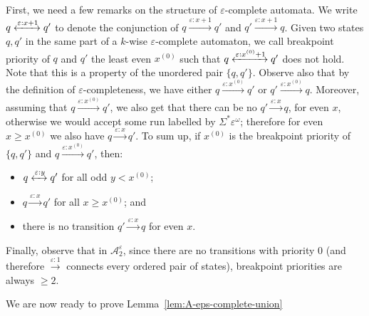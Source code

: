 \documentclass[a4paper,UKenglish,cleveref, thm-restate]{lipics-v2021}
\newcommand{\re}[1]{\xrightarrow{#1}}
\newcommand{\rer}[1]{\xleftrightarrow{#1}}
\newcommand{\eps}{\varepsilon}
\newcommand{\A}{\mathcal{A}}
\newcommand{\xbreak}{x^{(0)}}
\begin{document}
First, we need a few remarks on the structure of $\eps$-complete automata.
We write $q \rer{\eps:x+1} q'$ to denote the conjunction of $q \re{\eps:x+1} q' $ and $q' \re{\eps:x+1} q$.
Given two states $q,q'$ in the same part of a $k$-wise $\eps$-complete automaton, we call breakpoint priority of $q$ and $q'$ the least even $\xbreak$ such that $q \rer{\eps:\xbreak+1} q'$ does not hold.
Note that this is a property of the unordered pair $\{q,q'\}$.
Observe also that by the definition of $\eps$-completeness, we have either $q \re{\eps:\xbreak} q'$ or $q' \re{\eps:\xbreak} q$. Moreover, assuming that $q \re{\eps:\xbreak} q'$, we also get that there can be no $q' \re{\eps:x} q$, for even $x$, otherwise we would accept some run labelled by $\Sigma^* \eps^\omega$; therefore for even $x \geq \xbreak$ we also have $q \re{\eps:x} q'$.
To sum up, if $\xbreak$ is the breakpoint priority of $\{q,q'\}$ and $q \re{\eps:\xbreak} q'$, then: 
\begin{itemize}
    \item $q\rer{\eps:y} q'$ for all odd $y<\xbreak$;
    \item $q\re{\eps:x} q'$ for all $x\geq \xbreak$; and
    \item there is no transition $q'\re{\eps:x} q$ for even $x$.
\end{itemize}
Finally, observe that in $\A_2^\eps$, since there are no transitions with priority $0$ (and therefore $\re{\eps:1}$ connects every ordered pair of states), breakpoint priorities are always $\geq 2$.


We are now ready to prove Lemma~\ref{lem:A-eps-complete-union}
\end{document}
